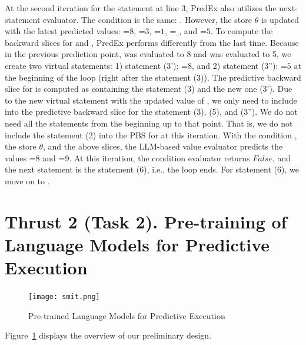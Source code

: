 At the second iteration for the  statement at line 3,
PredEx also utilizes the next-statement evaluator. The condition is
the same: . However, the store $\theta$ is updated with
the latest predicted values: =$8$, =$3$, =$1$,
=$\_$, and =$5$. To compute the backward
slices for  and , PredEx performs differently
from the last time. Because in the previous prediction point, 
was evaluated to 8 and  was evaluated to 5, we create two
virtual statements: 1) statement (3'): =$8$, and 2) statement
(3''): =$5$ at the beginning of the loop (right after the
statement (3)). The predictive backward slice for  is computed
as containing the statement (3) and the new one (3'). Due to the new
virtual statement with the updated value of , we only need
to include into the predictive backward slice for  the
statement (3), (5), and (3''). We do not need all the statements from
the beginning up to that point. That is, we do not include the
statement (2) into the PBS for  at this iteration.
With the condition , the store $\theta$, and the above
slices, the LLM-based value evaluator predicts the values =$8$
and =$9$. At this iteration, the condition evaluator
returns $False$, and the next statement is the statement (6), i.e.,
the loop ends.  For statement (6), we move on to
.


\section{Thrust 2 (Task 2). Pre-training of Language Models for Predictive Execution}

\begin{figure}[t]
\begin{center}
\texttt{[image: smit.png]}
\vspace{-12pt}
\caption{Pre-trained Language Models for Predictive Execution}
\label{fig:smit}
\end{center}
\end{figure}


Figure~\ref{fig:smit} displays the overview of our preliminary design.

